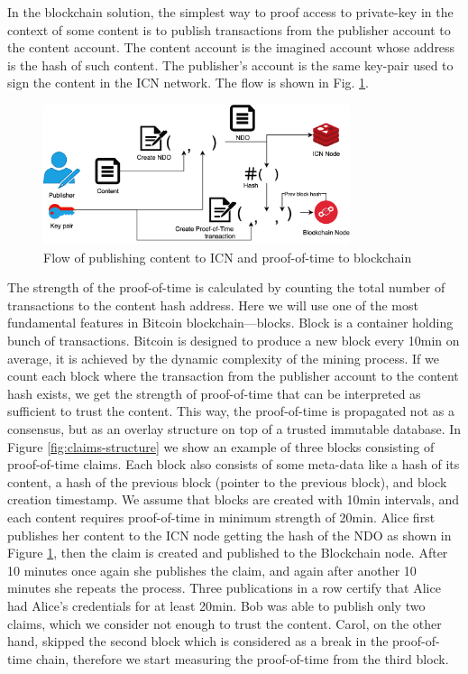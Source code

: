 \documentclass[nostrict]{szablonPG}
\begin{document}
In the blockchain solution, the simplest way to proof access to private-key in the context of some content is to publish transactions from the publisher account to the content account. The content account is the imagined account whose address is the hash of such content. The publisher's account is the same key-pair used to sign the content in the ICN network. The flow is shown in Fig. \ref{fig:distribution-flow}.
\begin{figure}[h!]
\includegraphics[width=9cm]{img/distribution-flow.png}
\centering
\caption{Flow of publishing content to ICN and proof-of-time to blockchain}
\label{fig:distribution-flow}
\end{figure} 
The strength of the proof-of-time is calculated by counting the total number of transactions to the content hash address. 
Here we will use one of the most fundamental features in Bitcoin blockchain––blocks. Block is a container holding bunch of transactions. Bitcoin is designed to produce a new block every 10min on average, it is achieved by the dynamic complexity of the mining process. If we count each block where the transaction from the publisher account to the content hash exists, we get the strength of proof-of-time that can be interpreted as sufficient to trust the content. This way, the proof-of-time is propagated not as a consensus, but as an overlay structure on top of a trusted immutable database. In Figure \ref{fig:claims-structure} we show an example of three blocks consisting of proof-of-time claims. Each block also consists of some meta-data like a hash of its content, a hash of the previous block (pointer to the previous block), and block creation timestamp. We assume that blocks are created with 10min intervals, and each content requires proof-of-time in minimum strength of 20min. Alice first publishes her content to the ICN node getting the hash of the NDO as shown in Figure \ref{fig:distribution-flow}, then the claim is created and published to the Blockchain node. After 10 minutes once again she publishes the claim, and again after another 10 minutes she repeats the process. Three publications in a row certify that Alice had Alice's credentials for at least 20min. Bob was able to publish only two claims, which we consider not enough to trust the content. Carol, on the other hand, skipped the second block which is considered as a break in the proof-of-time chain, therefore we start measuring the proof-of-time from the third block.
\end{document}
